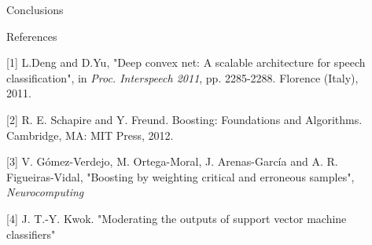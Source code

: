 \documentclass[final,hyperref={pdfpagelabels=false}]{beamer}
\begin{document}
\begin{frame}[t]
\begin{columns}[t]
\begin{column}{.465\textwidth}
\begin{block}{Conclusions}
\end{block}


\begin{block}{References}
        
\nocite{*} %
\small{

[1] L.Deng and D.Yu, "Deep convex net: A scalable architecture for speech classification", in \textit{Proc. Interspeech 2011}, pp. 2285-2288. Florence (Italy), 2011.

[2] R. E. Schapire and Y. Freund. Boosting: Foundations and Algorithms. Cambridge, MA: MIT Press, 2012.

[3] V. G\'{o}mez-Verdejo, M. Ortega-Moral, J. Arenas-Garc\'{i}a and A. R. Figueiras-Vidal, "Boosting by weighting critical and erroneous samples", \textit{Neurocomputing}

[4] J. T.-Y. Kwok.  "Moderating the outputs of support vector machine classifiers"

}

\end{block}










\end{column} %

\begin{column}{.015\textwidth}\end{column} %

\end{columns} %

\end{frame} %
\end{document}
